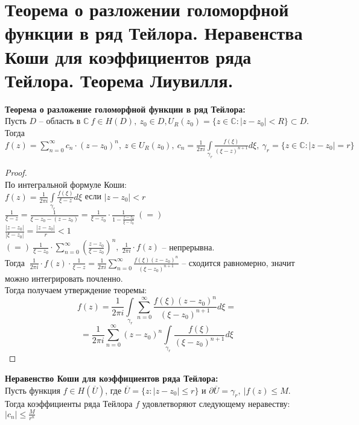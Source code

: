 \newpage
\section{Теорема о разложении голоморфной функции в ряд Тейлора. Неравенства Коши для коэффициентов ряда Тейлора. Теорема Лиувилля.}

\textbf{Теорема о разложение голоморфной функции в ряд Тейлора:}\\[2mm]
Пусть $D$ -- область в $\mathbb{C} \ f \in H(D), \ z_0 \in D, U_R(z_0) = \{z \in \mathbb{C}: |z-z_0| < R\} \subset D$. \\[2mm]
Тогда $f(z) = \sum_{n=0}^{\infty}c_n \cdot (z-z_0)^n, \ z \in U_R(z_0), \ c_n = \frac{1}{2\pi i} \int \limits_{{\gamma}_r} \frac{f(\xi)}{(\xi-z)^{n+1}} d\xi, \ \gamma_r = \{z \in \mathbb{C}: |z-z_0| = r\}$


\begin{proof}
	\ \\
	По интегральной формуле Коши: \\[2mm]
	$f(z) = \frac{1}{2 \pi i} \int \limits_{{\gamma}_r} \frac{f(\xi)}{\xi - z} d\xi$ если $|z-z_0| < r$\\[2mm]
	$\frac{1}{\xi - z} = \frac{1}{\xi - z_0 - (z - z_0)} = \frac{1}{\xi - z_0} \cdot \frac{1}{1 - \frac{z-z_0}{\xi - z_0}} \ (=)$\\[2mm]
	$\frac{|z-z_0|}{|\xi - z_0|} = \frac{|z - z_0|}{r} < 1$\\[2mm]
	$(=) \ \frac{1}{\xi-z_0} \cdot \sum_{n=0}^{\infty} \left( \frac {z-z_0}{\xi - z_0}\right)^n, \ \frac{1}{2 \pi i} \cdot f(z)$ -- непрерывна. \\[2mm]
	Тогда $ \ \frac{1}{2 \pi i} \cdot f(z) \cdot \frac{1}{\xi - z} = \frac{1}{2 \pi i} \sum_{n=0}^\infty \frac{f(\xi)(z-z_0)^n}{(\xi - z_0)^{n+1}}$ -- сходится равномерно, значит можно интегрировать почленно. \\[2mm]
	Тогда получаем утверждение теоремы:
	$$
	f(z) = \frac{1}{2 \pi i} \int \limits_{{\gamma}_r} \sum_{n=0}^{\infty}\frac{f(\xi) (z - z_0)^n}{(\xi - z_0)^{n+1}}d\xi =$$ 
	$$= \frac{1}{2 \pi i}\sum_{n=0}^{\infty}(z-z_0)^n \int \limits_{{\gamma}_r} \frac{f(\xi)}{(\xi-z_0)^{n+1}}d\xi
	$$
\end{proof}


\textbf{Неравенство Коши для коэффициентов ряда Тейлора:}\\[2mm]
Пусть функция $f \in H(\overline{U})$, где $\overline{U} = \{ z: |z-z_0| \leq r\}$ и $\partial\overline{U} = {\gamma}_r, \ |f(z) \leq M$. \\[2mm]
Тогда коэффициенты ряда Тейлора $f$ удовлетворяют следующему неравеству: $|c_n| \leq \frac{M}{r^n}$ 


